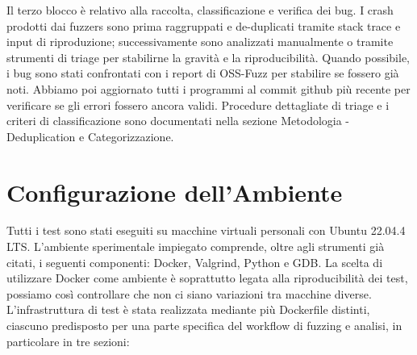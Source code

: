 Il terzo blocco è relativo alla raccolta, classificazione e verifica dei bug. I crash prodotti dai fuzzers sono prima raggruppati e de-duplicati tramite stack trace e input di riproduzione; successivamente sono analizzati manualmente o tramite strumenti di triage per stabilirne la gravità e la riproducibilità. Quando possibile, i bug sono stati confrontati con i report di OSS-Fuzz per stabilire se fossero già noti. Abbiamo poi aggiornato tutti i programmi al commit github più recente per verificare se gli errori fossero ancora validi. 
Procedure dettagliate di triage e i criteri di classificazione sono documentati nella sezione Metodologia - Deduplication e Categorizzazione.

\section{Configurazione dell'Ambiente}

Tutti i test sono stati eseguiti su macchine virtuali personali con Ubuntu 22.04.4 LTS. L’ambiente sperimentale impiegato comprende, oltre agli strumenti già citati, i seguenti componenti: Docker, Valgrind, Python e GDB. La scelta di utilizzare Docker come ambiente è soprattutto legata alla riproducibilità dei test, possiamo così controllare che non ci siano variazioni tra macchine diverse. L’infrastruttura di test è stata realizzata mediante più Dockerfile distinti, ciascuno predisposto per una parte specifica del workflow di fuzzing e analisi, in particolare in tre sezioni:

